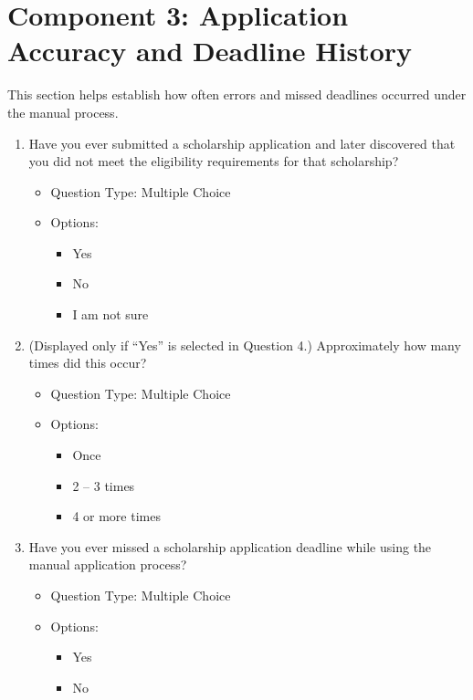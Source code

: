 \section{Component 3: Application Accuracy and Deadline History}

This section helps establish how often errors and missed deadlines occurred under the manual process.

\begin{enumerate}[resume=q, label={Question \arabic*:}, leftmargin=*, align=left]
  \item Have you ever submitted a scholarship application and later discovered that you did not meet the eligibility requirements for that scholarship?
  \begin{itemize}[leftmargin=*]
    \item Question Type: Multiple Choice
    \item Options:
    \begin{itemize}[leftmargin=*]
      \item Yes
      \item No
      \item I am not sure
    \end{itemize}
  \end{itemize}
  \item (Displayed only if ``Yes'' is selected in Question 4.) Approximately how many times did this occur?
  \begin{itemize}[leftmargin=*]
    \item Question Type: Multiple Choice
    \item Options:
    \begin{itemize}[leftmargin=*]
      \item Once
      \item 2 -- 3 times
      \item 4 or more times
    \end{itemize}
  \end{itemize}
  \item Have you ever missed a scholarship application deadline while using the manual application process?
  \begin{itemize}[leftmargin=*]
    \item Question Type: Multiple Choice
    \item Options:
    \begin{itemize}[leftmargin=*]
      \item Yes
      \item No
    \end{itemize}

\end{itemize}
\end{enumerate}
